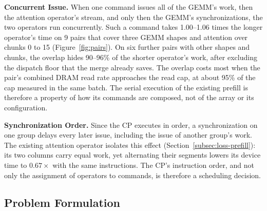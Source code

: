 \textbf{Concurrent Issue.}
When one command issues all of the GEMM's work, then the attention operator's stream, and only then the GEMM's synchronizations, the two operators run concurrently.
Such a command takes 1.00--1.06 times the longer operator's time on 9 pairs that cover three GEMM shapes and attention over chunks 0 to 15 (Figure~\ref{fig:pairs}).
On six further pairs with other shapes and chunks, the overlap hides 90--96\% of the shorter operator's work, after excluding the dispatch floor that the merge already saves.
The overlap costs most when the pair's combined DRAM read rate approaches the read cap, at about 95\% of the cap measured in the same batch.
The serial execution of the existing prefill is therefore a property of how its commands are composed, not of the array or its configuration.

\textbf{Synchronization Order.}
Since the CP executes in order, a synchronization on one group delays every later issue, including the issue of another group's work.
The existing attention operator isolates this effect (Section~\ref{subsec:loss-prefill}): its two columns carry equal work, yet alternating their segments lowers its device time to $0.67\times$ with the same instructions.
The CP's instruction order, and not only the assignment of operators to commands, is therefore a scheduling decision.

\subsection{Problem Formulation}
\label{subsec:formulation}

